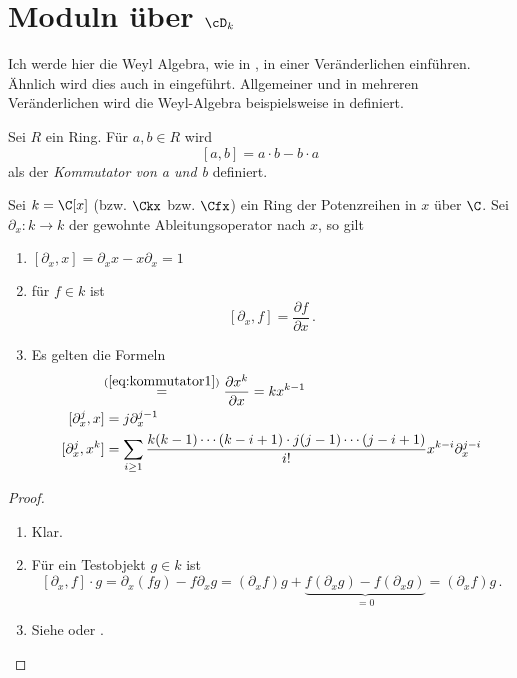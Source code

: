 
\chapter{Moduln über $\cD_k$}
Ich werde hier die Weyl Algebra, wie in \cite[Chapter~1]{sabbah_cimpa90}, in
einer Veränderlichen einführen. Ähnlich wird dies auch in
\cite[Kapittel~2]{ZulaBarbara} eingeführt. Allgemeiner und in mehreren
Veränderlichen wird die Weyl-Algebra beispielsweise in
\cite[Chapter~1]{coutinho1995primer} definiert.

\begin{defn}[Kommutator]%
Sei $R$ ein Ring. Für $a,b\in R$ wird
\[[a,b]=a\cdot b-b\cdot a\]
als der \emph{Kommutator von a und b} definiert.
\end{defn}

\begin{prop} \label{prop:d-modul-komutator-regeln}
Sei $k= \C[x]$ (bzw. $\Ckx$ bzw. $\Cfx$) ein Ring der Potenzreihen in $x$ über
$\C$. Sei $\partial_x:k\rightarrow k$ der gewohnte Ableitungsoperator nach $x$,
so gilt 
\begin{enumerate}
\item $[ \partial_x,x] = \partial_xx-x\partial_x=1 $
\item für $f\in k$ ist
\begin{equation} \label{eq:kommutator1}
[\partial_x,f] = \frac{\partial f}{\partial x} \,. 
\end{equation}
\item Es gelten die Formeln
\begin{align}
[\partial_x,x^k] &\!\!\overset{(\ref{eq:kommutator1})}{=}
  \frac{\partial x^k}{\partial x} = kx^{k-1}
  \label{eq:kommutator1b}\\
[\partial_x^j,x]   &= j\partial_x^{j-1}
  \label{eq:kommutator2}\\
[\partial_x^j,x^k] &= \sum_{i\geq1}\frac{k(k-1)\cdots(k-i+1)
  \cdot j(j-1)\cdots(j-i+1)}{i!}x^{k-i}\partial_x^{j-i}
  \label{eq:kommutator3}
\end{align}
\end{enumerate}
\end{prop}
\begin{proof}
\begin{enumerate}
\item Klar.
\item Für ein Testobjekt $g\in k$ ist
\[
[\partial_x,f]\cdot g=\partial_x(fg)-f\partial_xg=
  (\partial_xf)g+\underset{=0}{\underbrace{ 
  f(\partial_xg)-f(\partial_xg)}}=
  (\partial_xf)g \,.
\]
\item Siehe \cite[1.2.4.]{sabbah_cimpa90} oder \cite[Kor 2.8]{ZulaBarbara}.
\end{enumerate}
\end{proof}

